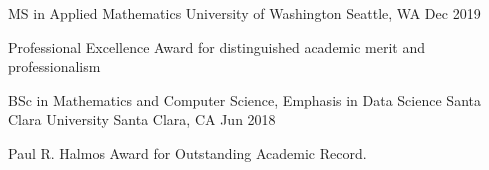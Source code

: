 
\begin{cventries}

  \cventry
    {MS in Applied Mathematics} %
    {University of Washington} %
    {Seattle, WA} %
    {Dec 2019} %
    {
      \begin{cvitems} %
        \item {Professional Excellence Award for distinguished academic merit and professionalism}
      \end{cvitems}
    }

  \cventry
    {BSc in Mathematics and Computer Science, Emphasis in Data Science} %
    {Santa Clara University} %
    {Santa Clara, CA} %
    {Jun 2018} %
    {
      \begin{cvitems} %
        \item {Paul R. Halmos Award for Outstanding Academic Record.}
      \end{cvitems}
    }

\end{cventries}
